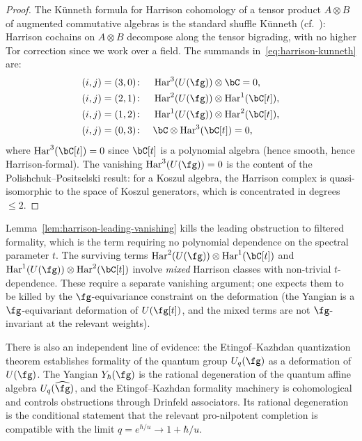 \begin{proof}
The K\"unneth formula for Harrison cohomology of a tensor
product $A \otimes B$ of augmented commutative algebras is
the standard shuffle K\"unneth
(cf.~\cite{loday1992cyclic}): Harrison cochains on
$A \otimes B$ decompose along the tensor bigrading, with no
higher Tor correction since we work over a field. The
summands in~\eqref{eq:harrison-kunneth} are:
\begin{align*}
 (i,j) = (3,0)&\colon\quad
 \Har^3(U(\fg)) \otimes \bC = 0,\\
 (i,j) = (2,1)&\colon\quad
 \Har^2(U(\fg)) \otimes \Har^1(\bC[t]),\\
 (i,j) = (1,2)&\colon\quad
 \Har^1(U(\fg)) \otimes \Har^2(\bC[t]),\\
 (i,j) = (0,3)&\colon\quad
 \bC \otimes \Har^3(\bC[t]) = 0,
\end{align*}
where $\Har^3(\bC[t]) = 0$ since $\bC[t]$ is a polynomial
algebra (hence smooth, hence Harrison-formal). The
vanishing $\Har^3(U(\fg)) = 0$ is the content of the
Polishchuk--Positselski result: for a Koszul algebra, the
Harrison complex is quasi-isomorphic to the space of Koszul
generators, which is concentrated in degrees $\le 2$.
\end{proof}

\begin{remark}
\label{rem:filtered-formality-evidence}
Lemma~\ref{lem:harrison-leading-vanishing} kills the leading
obstruction to filtered formality, which is the term
requiring no polynomial dependence on the spectral parameter
$t$. The surviving terms $\Har^2(U(\fg)) \otimes
\Har^1(\bC[t])$ and $\Har^1(U(\fg)) \otimes
\Har^2(\bC[t])$ involve \emph{mixed} Harrison classes with
non-trivial $t$-dependence. These require a separate
vanishing argument; one expects them to be killed by the
$\fg$-equivariance constraint on the deformation (the
Yangian is a $\fg$-equivariant deformation of $U(\fg[t])$,
and the mixed terms are not $\fg$-invariant at the relevant
weights).

There is also an independent line of evidence: the
Etingof--Kazhdan quantization theorem
\cite{etingof1996quantization} establishes formality of the
quantum group $U_q(\fg)$ as a deformation of $U(\fg)$. The
Yangian $Y_\hbar(\fg)$ is the rational degeneration of the
quantum affine algebra $U_q(\widehat{\fg})$, and the
Etingof--Kazhdan formality machinery is cohomological and controls
obstructions through Drinfeld associators. Its rational degeneration is
the conditional statement that the relevant pro-nilpotent completion is
compatible with the limit $q=e^{\hbar/u}\to 1+\hbar/u$.
\end{remark}


